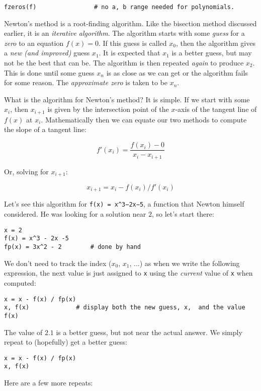 \documentclass[12pt]{article}
\begin{document}
\begin{verbatim}
fzeros(f)                # no a, b range needed for polynomials.
\end{verbatim}
Newton's method is a root-finding algorithm. Like the bisection method
discussed earlier, it is an \emph{iterative algorithm}. The algorithm
starts with some \emph{guess} for a \emph{zero} to an equation
$f(x) = 0$. If this guess is called $x_0$, then the algorithm gives a
\emph{new (and improved)} guess $x_1$. It is expected that $x_1$ is a
better guess, but may not be the best that can be. The algorithm is then
repeated \emph{again} to produce $x_2$. This is done until some guess
$x_n$ is as close as we can get or the algorithm fails for some reason.
The \emph{approximate zero} is taken to be $x_n$.

What is the algorithm for Newton's method? It is simple. If we start
with some $x_i$, then $x_{i+1}$ is given by the intersection point of
the $x$-axis of the tangent line of $f(x)$ at $x_i$. Mathematically then
we can equate our two methods to compute the slope of a tangent line:

\[
f'(x_i) = \frac{f(x_i) - 0}{x_i - x_{i+1}}
\]

Or, solving for $x_{i+1}$:

\[
x_{i+1} = x_i - f(x_i)/f'(x_i)
\]

Let's see this algorithm for \texttt{f(x) = x\^{}3−2x−5}, a function
that Newton himself considered. He was looking for a solution near $2$,
so let's start there:



\begin{verbatim}
x = 2
f(x) = x^3 - 2x -5
fp(x) = 3x^2 - 2        # done by hand
\end{verbatim}
We don't need to track the index ($x_0$, $x_1$, ...) as when we write
the following expression, the next value is just assigned to \texttt{x}
using the \emph{current} value of \texttt{x} when computed:



\begin{verbatim}
x = x - f(x) / fp(x)
x, f(x)             # display both the new guess, x,  and the value f(x)
\end{verbatim}
The value of $2.1$ is a better guess, but not near the actual answer. We
simply repeat to (hopefully) get a better guess:



\begin{verbatim}
x = x - f(x) / fp(x)
x, f(x)
\end{verbatim}
Here are a few more repeats:
\end{document}
